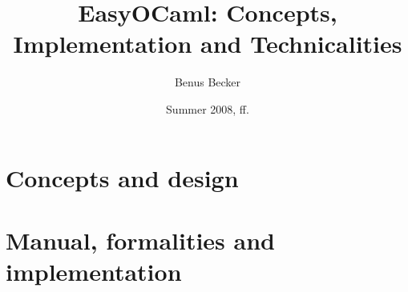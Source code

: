 \documentclass[11pt,titlepage,abstracton]{scrartcl} %
\title{EasyOCaml: Concepts, Implementation and Technicalities}
\author{Benus Becker}
\date{Summer 2008, ff.}
\begin{document}


\clearpage \part{Concepts and design} \label{part:concepts}




\clearpage \part{Manual, formalities and implementation} \label{part:implem}

\clearpage
\clearpage
\clearpage

\clearpage
\end{document}
